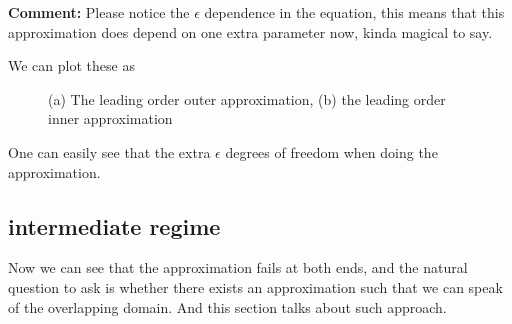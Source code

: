 \documentclass[a4paper, 12pt]{article}
\begin{document}
\textbf{Comment: } Please notice the \( \epsilon \) dependence in the
equation, this means that this approximation does depend on one extra
parameter now, kinda magical to say.
 
We can plot these as 

\begin{figure}[h!]
  \centering
     \caption{(a) The leading order outer approximation, (b) the leading order inner approximation}
\end{figure}

One can easily see that the extra \( \epsilon \) degrees of freedom when doing the approximation.

\subsection{intermediate regime}%
  \label{sub:intermediate regime}
  Now we can see that the approximation fails at both ends, and the natural
  question to ask is whether there exists an approximation such that we
  can speak of the overlapping domain. And this section talks about such
  approach.
\end{document}
